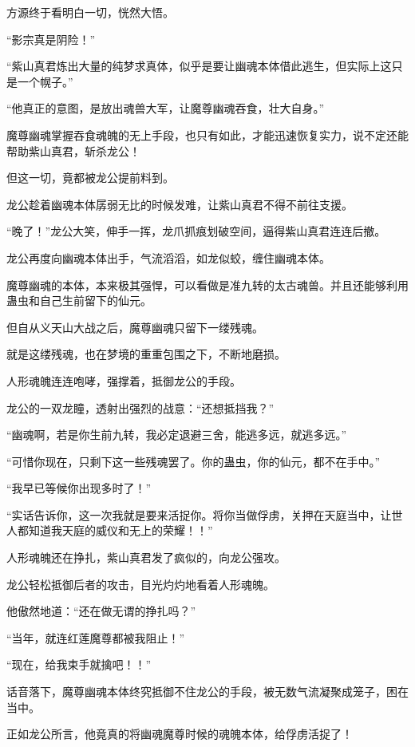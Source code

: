 \begin{this_body}
方源终于看明白一切，恍然大悟。

“影宗真是阴险！”

“紫山真君炼出大量的纯梦求真体，似乎是要让幽魂本体借此逃生，但实际上这只是一个幌子。”

“他真正的意图，是放出魂兽大军，让魔尊幽魂吞食，壮大自身。”

魔尊幽魂掌握吞食魂魄的无上手段，也只有如此，才能迅速恢复实力，说不定还能帮助紫山真君，斩杀龙公！

但这一切，竟都被龙公提前料到。

龙公趁着幽魂本体孱弱无比的时候发难，让紫山真君不得不前往支援。

“晚了！”龙公大笑，伸手一挥，龙爪抓痕划破空间，逼得紫山真君连连后撤。

龙公再度向幽魂本体出手，气流滔滔，如龙似蛟，缠住幽魂本体。

魔尊幽魂的本体，本来极其强悍，可以看做是准九转的太古魂兽。并且还能够利用蛊虫和自己生前留下的仙元。

但自从义天山大战之后，魔尊幽魂只留下一缕残魂。

就是这缕残魂，也在梦境的重重包围之下，不断地磨损。

人形魂魄连连咆哮，强撑着，抵御龙公的手段。

龙公的一双龙瞳，透射出强烈的战意：“还想抵挡我？”

“幽魂啊，若是你生前九转，我必定退避三舍，能逃多远，就逃多远。”

“可惜你现在，只剩下这一些残魂罢了。你的蛊虫，你的仙元，都不在手中。”

“我早已等候你出现多时了！”

“实话告诉你，这一次我就是要来活捉你。将你当做俘虏，关押在天庭当中，让世人都知道我天庭的威仪和无上的荣耀！！”

人形魂魄还在挣扎，紫山真君发了疯似的，向龙公强攻。

龙公轻松抵御后者的攻击，目光灼灼地看着人形魂魄。

他傲然地道：“还在做无谓的挣扎吗？”

“当年，就连红莲魔尊都被我阻止！”

“现在，给我束手就擒吧！！”

话音落下，魔尊幽魂本体终究抵御不住龙公的手段，被无数气流凝聚成笼子，困在当中。

正如龙公所言，他竟真的将幽魂魔尊时候的魂魄本体，给俘虏活捉了！

\end{this_body}

